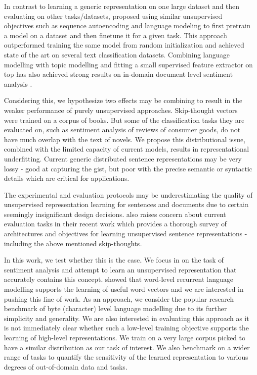 In contrast to learning a generic representation on one large dataset and then evaluating on other tasks/datasets, \citet{dai2015semi} proposed using similar unsupervised objectives such as sequence autoencoding and language modeling to first pretrain a model on a dataset and then finetune it for a given task. This approach outperformed training the same model from random initialization and achieved state of the art on several text classification datasets. Combining language modelling with topic modelling and fitting a small supervised feature extractor on top has also achieved strong results on in-domain document level sentiment analysis \cite{dieng2016topicrnn}.

Considering this, we hypothesize two effects may be combining to result in the weaker performance of purely unsupervised approaches. Skip-thought vectors were trained on a corpus of books. But some of the classification tasks they are evaluated on, such as sentiment analysis of reviews of consumer goods, do not have much overlap with the text of novels. We propose this distributional issue, combined with the limited capacity of current models, results in representational underfitting. Current generic distributed sentence representations may be very lossy - good at capturing the gist, but poor with the precise semantic or syntactic details which are critical for applications.

The experimental and evaluation protocols may be underestimating the quality of unsupervised representation learning for sentences and documents due to certain seemingly insignificant design decisions. \citet{hill2016learning} also raises concern about current evaluation tasks in their recent work which provides a thorough survey of architectures and objectives for learning unsupervised sentence representations - including the above mentioned skip-thoughts.

In this work, we test whether this is the case. We focus in on the task of sentiment analysis and attempt to learn an unsupervised representation that accurately contains this concept. \citet{mikolov2013linguistic} showed that word-level recurrent language modelling supports the learning of useful word vectors and we are interested in pushing this line of work. As an approach, we consider the popular research benchmark of byte (character) level language modelling due to its further simplicity and generality. We are also interested in evaluating this approach as it is not immediately clear whether such a low-level training objective supports the learning of high-level representations. We train on a very large corpus picked to have a similar distribution as our task of interest. We also benchmark on a wider range of tasks to quantify the sensitivity of the learned representation to various degrees of out-of-domain data and tasks.

